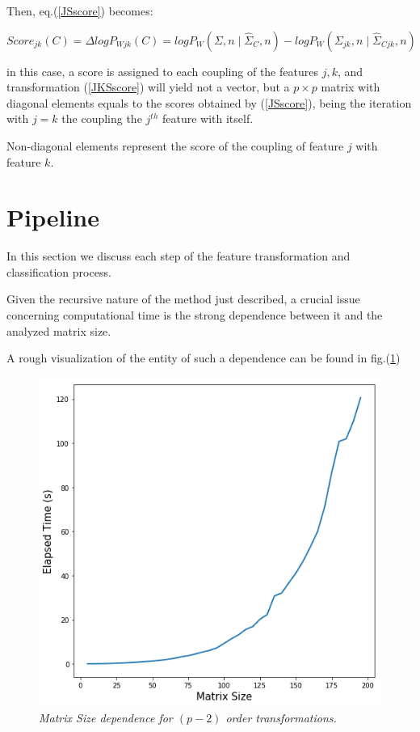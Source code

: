 \documentclass[12pt,openright,twoside,a4paper]{book}
\begin{document}
Then, eq.(\ref{JSscore}) becomes:

\begin{equation}
Score_{jk}(C)=\Delta logP_{Wjk}(C)=logP_W(\Sigma, n \mid \hat{\Sigma}_C,n)-logP_W(\Sigma_{jk}, n \mid \hat{\Sigma}_{Cjk},n)
\label{JKSscore}
\end{equation}
\vspace{5mm}

in this case, a score is assigned to each coupling of the features $j,k$, and transformation (\ref{JKSscore}) will yield not a vector, but a $p\times p$ matrix with diagonal elements equals to the scores obtained by (\ref{JSscore}), being the iteration with $j=k$ the coupling the $j^{th}$ feature with itself. 

Non-diagonal elements represent the score of the coupling of feature $j$ with feature $k$.

\section{Pipeline}

In this section we discuss each step of the feature transformation and classification process.

Given the recursive nature of the method just described, a crucial issue concerning computational time is the strong dependence between it and the analyzed matrix size.

A rough visualization of the entity of  such a dependence can be found in fig.(\ref{timevsize})

\begin{figure}[!h]
\centering
\includegraphics[scale=0.42]{RC2-timeVsize}
\caption{\textit{Matrix Size dependence for $(p-2)$ order transformations.}}
\label{timevsize}
\end{figure}
\end{document}
